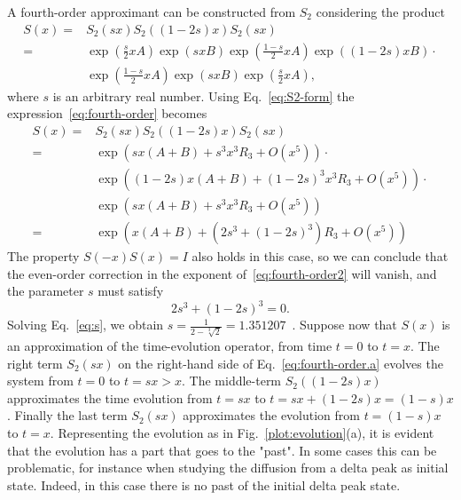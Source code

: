 A fourth-order approximant can be constructed from  $S_2$ considering the product
\begin{subequations} \label{eq:fourth-order}
\begin{align} \label{eq:fourth-order.a}
S(x) = & S_2(sx) S_2((1-2s)x) S_2(sx) \\
= & \exp\left({\frac{s}{2}xA}\right) \exp\left({sxB}\right) \exp\left({\frac{1-s}{2}xA}\right) \exp\left({(1-2s)xB}\right) \cdot \nonumber \\
&  \exp\left({\frac{1-s}{2}xA}\right) \exp\left({sxB}\right) \exp\left({\frac{s}{2}xA}\right),
\end{align}
\end{subequations}
where $s$ is an arbitrary real number. Using Eq.~\eqref{eq:S2-form} the expression~\eqref{eq:fourth-order} becomes
\begin{subequations} \label{eq:fourth-order2}
\begin{align} \label{eq:fourth-order2}
S(x) = & S_2(sx) S_2((1-2s)x) S_2(sx)	 \\
= & \exp\left({sx(A+B) + s^3x^3R_3 + O(x^5)}\right) \cdot \nonumber \\ & \exp\left({(1-2s)x(A+B) + (1-2s)^3x^3R_3 + O(x^5)}\right) \cdot \nonumber \\
& \exp\left({sx(A+B) + s^3x^3R_3 + O(x^5)}\right) \\
= & \exp\left({x(A+B)+(2s^3+(1-2s)^3)R_3+O(x^5)}\right) \label{eq:fourth-order2.3}
\end{align}
\end{subequations}
The property $S(-x)S(x) = I$ also holds in this case, so we can conclude that the even-order correction in the exponent of~\eqref{eq:fourth-order2} will vanish, and the parameter $s$ must satisfy
\begin{equation} \label{eq:s}
2s^3 + (1-2s)^3 = 0.
\end{equation}
Solving Eq.~\eqref{eq:s}, we obtain $s = \frac{1}{2-\sqrt[3]{2}} = 1.351207$~. Suppose now that $S(x)$ is an approximation of the time-evolution operator, from time $t=0$ to $t=x$. The right term $S_2(sx)$ on the right-hand side of Eq.~\eqref{eq:fourth-order.a} evolves the system from $t=0$ to $t=sx>x$. The middle-term $S_2((1-2s)x)$ approximates the time evolution from $t=sx$ to $t=sx + (1-2s)x = (1-s)x$. Finally the last term $S_2(sx)$ approximates the evolution from $t=(1-s)x$ to $t=x$. Representing the evolution as in Fig.~\ref{plot:evolution}(a), it is evident that the evolution has a part that goes to the "past". In some cases this can be problematic, for instance when studying the diffusion from a delta peak as initial state. Indeed, in this case there is no past of the initial delta peak state. 

